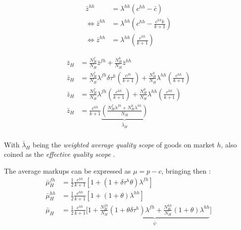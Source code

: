 \begin{align*}
     \bar{z}^{hh} &= \lambda^{hh}(c^{hh} - \bar{c}) \\
     \Longleftrightarrow \bar{z}^{hh} &= \lambda^{hh}(c^{hh} - \frac{c^{hh}k}{k+1}) \\
     \Longleftrightarrow \bar{z}^{hh} &= \lambda^{hh}\left(\frac{c^{hh}}{k+1}\right)
\end{align*}

\begin{align*}
     \bar{z}_{H} &= \frac{N_H^f}{N_H} \bar{z}^{fh} + \frac{N_H^h}{N_H} \bar{z}^{hh} \\
     \bar{z}_{H} &= \frac{N_H^f}{N_H} \lambda^{fh}\delta \tau^h \left(\frac{c^{fh}}{k+1}\right) + \frac{N_H^h}{N_H} \lambda^{hh}\left(\frac{c^{hh}}{k+1}\right) \\
     \bar{z}_{H} &= \frac{N_H^f}{N_H} \lambda^{fh}\left(\frac{c^{hh}}{k+1}\right) + \frac{N_H^h}{N_H} \lambda^{hh}\left(\frac{c^{hh}}{k+1}\right) \\
     \bar{z}_{H} &= \frac{c^{hh}}{k+1} \underbrace{\left(\frac{N_H^f \lambda^{fh} + N_H^h\lambda^{hh}}{N_H} \right)}_{\bar{\lambda}_H} \\
\end{align*}

With $\bar{\lambda}_H$ being the \textit{weighted average quality scope} of goods on market $h$, also coined as the \textit{effective quality scope} \citep{antoniadesHeterogeneousFirmsQuality2015}.

The average markups can be expressed as $\mu = p - c$, bringing then : 
\begin{align*}
    \bar{\mu}_H^{fh} &= \frac{1}{2} \frac{c^{hh}}{k+1} [1 + (1 + \delta \tau^h\theta)\lambda^{fh}] \\
    \bar{\mu}_H^{hh} &= \frac{1}{2} \frac{c^{hh}}{k+1} [1 + (1 + \theta)\lambda^{hh}] \\
    \bar{\mu}_H &= \frac{1}{2} \frac{c^{hh}}{k+1} \bigg[1 + \underbrace{\frac{N_H^{fh}}{N_H} (1 + \theta \delta \tau^h)\lambda^{fh}+ \frac{N_H^{hh}}{N_H} (1 + \theta )\lambda^{hh}}_{\bar{\psi}}\bigg]
\end{align*}